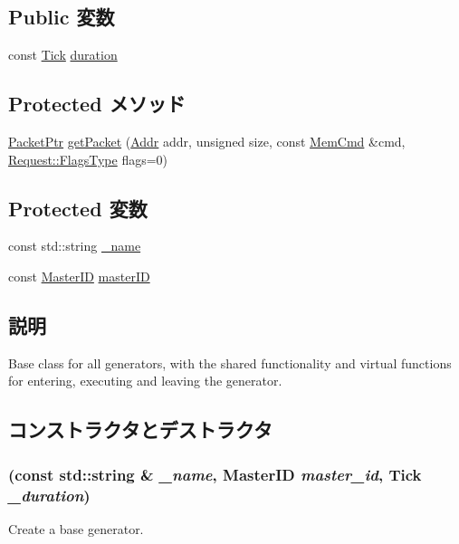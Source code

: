 \subsection*{Public 変数}
\begin{DoxyCompactItemize}
\item 
const \hyperlink{base_2types_8hh_a5c8ed81b7d238c9083e1037ba6d61643}{Tick} \hyperlink{classBaseGen_a8868e82db2ec9f48892f03bd5c3ae0e1}{duration}
\end{DoxyCompactItemize}
\subsection*{Protected メソッド}
\begin{DoxyCompactItemize}
\item 
\hyperlink{classPacket}{PacketPtr} \hyperlink{classBaseGen_ae4f945239fa7bde755f55122f661f467}{getPacket} (\hyperlink{base_2types_8hh_af1bb03d6a4ee096394a6749f0a169232}{Addr} addr, unsigned size, const \hyperlink{classMemCmd}{MemCmd} \&cmd, \hyperlink{classRequest_a2da503161d95c65aea559dbabcf570aa}{Request::FlagsType} flags=0)
\end{DoxyCompactItemize}
\subsection*{Protected 変数}
\begin{DoxyCompactItemize}
\item 
const std::string \hyperlink{classBaseGen_a1b003dc5cfce1a4d8f9a0c4b9b589045}{\_\-name}
\item 
const \hyperlink{request_8hh_ac366b729262fd8e7cbd3283da6f775cf}{MasterID} \hyperlink{classBaseGen_ac8d391dc05bee23af38946b9b3f80674}{masterID}
\end{DoxyCompactItemize}


\subsection{説明}
Base class for all generators, with the shared functionality and virtual functions for entering, executing and leaving the generator. 

\subsection{コンストラクタとデストラクタ}
\hypertarget{classBaseGen_ac9104baf1e55a6b796dbe3d08d9b348c}{
\subsubsection[{BaseGen}]{ (const std::string \& {\em \_\-name}, \/  {\bf MasterID} {\em master\_\-id}, \/  {\bf Tick} {\em \_\-duration})}}
\label{classBaseGen_ac9104baf1e55a6b796dbe3d08d9b348c}
Create a base generator.


